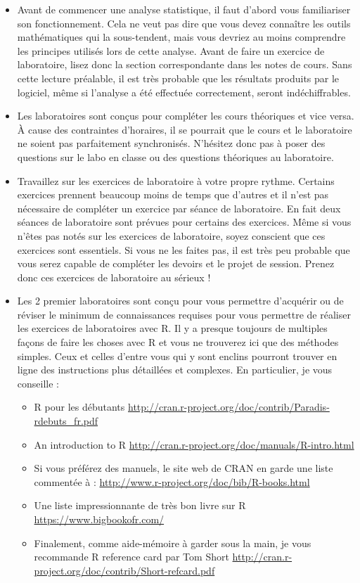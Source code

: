 \documentclass[
  12pt,
]{book}
\providecommand{\tightlist}{%
  \setlength{\itemsep}{0pt}\setlength{\parskip}{0pt}}
\begin{document}
\begin{itemize}
\item
  Avant de commencer une analyse statistique, il faut d'abord vous familiariser son fonctionnement.
  Cela ne veut pas dire que vous devez connaître les outils mathématiques qui la sous-tendent, mais vous devriez au moins comprendre les principes utilisés lors de cette analyse.
  Avant de faire un exercice de laboratoire, lisez donc la section correspondante dans les notes de cours.
  Sans cette lecture préalable, il est très probable que les résultats produits par le logiciel, même si l'analyse a été effectuée correctement, seront indéchiffrables.
\item
  Les laboratoires sont conçus pour compléter les cours théoriques et vice versa.
  À cause des contraintes d'horaires, il se pourrait que le cours et le laboratoire ne soient pas parfaitement synchronisés.
  N'hésitez donc pas à poser des questions sur le labo en classe ou des questions théoriques au laboratoire.
\item
  Travaillez sur les exercices de laboratoire à votre propre rythme.
  Certains exercices prennent beaucoup moins de temps que d'autres et il n'est pas nécessaire de compléter un exercice par séance de laboratoire.
  En fait deux séances de laboratoire sont prévues pour certains des exercices.
  Même si vous n'êtes pas notés sur les exercices de laboratoire, soyez conscient que ces exercices
  sont essentiels.
  Si vous ne les faites pas, il est très peu probable que vous serez capable de compléter les devoirs et le projet de session.
  Prenez donc ces exercices de laboratoire au sérieux !
\item
  Les 2 premier laboratoires sont conçu pour vous permettre d'acquérir ou de réviser le minimum de connaissances requises pour vous permettre de réaliser les exercices de laboratoires avec R.
  Il y a presque toujours de multiples façons de faire les choses avec R et vous ne trouverez ici que des méthodes simples.
  Ceux et celles d'entre vous qui y sont enclins pourront trouver en ligne des instructions plus détaillées et complexes.
  En particulier, je vous conseille :

  \begin{itemize}
  \tightlist
  \item
    R pour les débutants
    \url{http://cran.r-project.org/doc/contrib/Paradis-rdebuts_fr.pdf}
  \item
    An introduction to R
    \url{http://cran.r-project.org/doc/manuals/R-intro.html}
  \item
    Si vous préférez des manuels, le site web de CRAN en garde une liste commentée à :
    \url{http://www.r-project.org/doc/bib/R-books.html}
  \item
    Une liste impressionnante de très bon livre sur R
    \url{https://www.bigbookofr.com/}
  \item
    Finalement, comme aide-mémoire à garder sous la main, je vous recommande R reference card par Tom Short
    \url{http://cran.r-project.org/doc/contrib/Short-refcard.pdf}
  \end{itemize}
\end{itemize}
\end{document}
